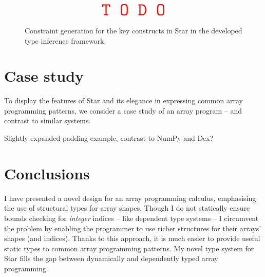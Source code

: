 \begin{figure}
    \centering
    \begin{align*}
        \color{red} \texttt{\Huge T O D O}
    \end{align*}
    \caption{Constraint generation for the key constructs in Star in the developed type inference framework.}
    \label{fig:star-type-constraints}
\end{figure}

\section{Case study}

To display the features of Star and its elegance in expressing common array programming patterns, we consider a case study of an array program -- and contrast to similar systems.

\begin{center}
    \color{red} Slightly expanded padding example, contrast to NumPy and Dex?
\end{center}

\section{Conclusions}

I have presented a novel design for an array programming calculus, emphasising the use of structural types for array shapes. 
Though I do not statically ensure bounds checking for \emph{integer} indices -- like dependent type systems -- I circumvent the problem by enabling the programmer to use richer structures for their arrays' shapes (and indices). 
Thanks to this approach, it is much easier to provide useful static types to common array programming patterns. 
My novel type system for Star fills the gap between dynamically and dependently typed array programming.